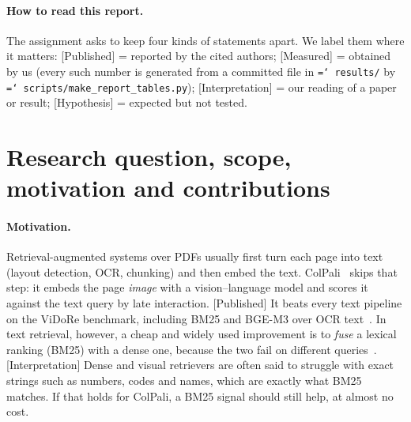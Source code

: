 \documentclass[11pt,a4paper]{article}
\newcommand{\lbl}[2]{\textsf{\scriptsize\textcolor{#1}{[#2]}}}
\newcommand{\Pub}{\lbl{tagP}{Published}}
\newcommand{\Int}{\lbl{tagI}{Interpretation}}
\newcommand{\Mea}{\lbl{tagM}{Measured}}
\newcommand{\Hyp}{\lbl{tagH}{Hypothesis}}
\newcommand{\file}[1]{\texttt{\small\hyphenchar\font=`\/ #1}}
\begin{document}
\begin{abstract}
A third post-hoc set targets the misses directly. It tests a Qwen3-VL visual reranker on ColPali's top 20, selective fusion, BM25 over a Qwen3.5 transcription, and a Qwen3-VL embedding ensemble. None improves reliably on test. The visual reranker gains \deltaBvr{} ($p_\text{Holm}$ \pHolmBvr{}) after \deltaBvrDevPts{} points on dev, and fusing the cleaner transcription still hurts (\deltaCvlm{}).
A fourth set tests newer visual models. A newer ColPali-style retriever (Tomoro ColQwen3-4B) beats ColPali on DocVQA test (\deltaTM{}, $p_\text{Holm}$ \pHolmTM{}), and so does fusing it with ColPali (\deltaFtm{}). Its gain holds when it is evaluated once, frozen, on a task not used for any choice (InfoVQA, \infoDelta{}, $p$ = \infoP{}). Fusion helps when the second ranking is visual and strong, and it hurts when the second ranking is text-based.
A fifth set applies the frozen DocVQA fusion settings to the nine other ViDoRe~v1 tasks. BM25 fusion is significantly worse than ColPali on \pfSigLoss{} of them and significantly better on \pfSigGain{}. A leave-one-task-out router that chooses per query between ColPali and fusion does not help either.
\end{abstract}

\paragraph{How to read this report.} The assignment asks to keep four kinds of statements apart. We label them where it matters: \Pub{} = reported by the cited authors; \Mea{} = obtained by us (every such number is generated from a committed file in \file{results/} by \file{scripts/make\_report\_tables.py}); \Int{} = our reading of a paper or result; \Hyp{} = expected but not tested.

\section{Research question, scope, motivation and contributions}
\label{sec:rq}

\paragraph{Motivation.}
Retrieval-augmented systems over PDFs usually first turn each page into text (layout detection, OCR, chunking) and then embed the text. ColPali~\cite{colpali} skips that step: it embeds the page \emph{image} with a vision--language model and scores it against the text query by late interaction. \Pub{} It beats every text pipeline on the ViDoRe benchmark, including BM25 and BGE-M3 over OCR text~\cite[Table~2]{colpali}.
In text retrieval, however, a cheap and widely used improvement is to \emph{fuse} a lexical ranking (BM25) with a dense one, because the two fail on different queries~\cite{bruch,cormack}. \Int{} Dense and visual retrievers are often said to struggle with exact strings such as numbers, codes and names, which are exactly what BM25 matches. If that holds for ColPali, a BM25 signal should still help, at almost no cost.
\end{document}
